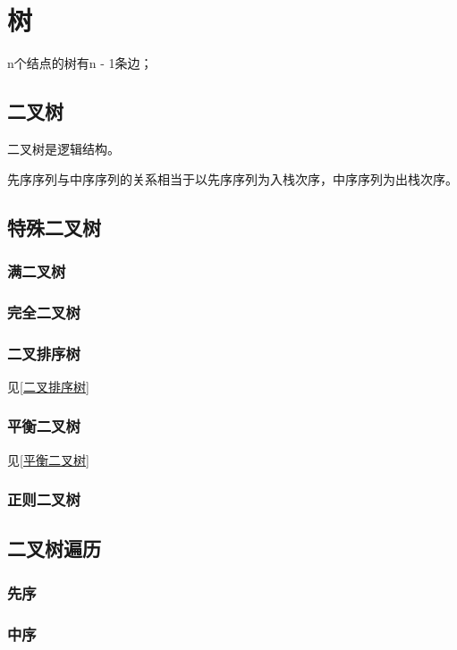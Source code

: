 
\chapter{树}
n个结点的树有n - 1条边；


\section{二叉树}

二叉树是逻辑结构。

先序序列与中序序列的关系相当于以先序序列为入栈次序，中序序列为出栈次序。


\section{特殊二叉树}

\subsection{满二叉树}


\subsection{完全二叉树}


\subsection{二叉排序树}
见\ref{二叉排序树}

\subsection{平衡二叉树}
见\ref{平衡二叉树}

\subsection{正则二叉树}


\section{二叉树遍历}

\subsection{先序}

\subsection{中序}

